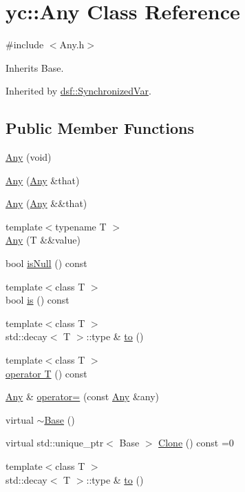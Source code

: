 \hypertarget{classyc_1_1_any}{}\section{yc\+:\+:Any Class Reference}
\label{classyc_1_1_any}


{\ttfamily \#include $<$Any.\+h$>$}



Inherits Base.



Inherited by \hyperlink{classdsf_1_1_synchronized_var}{dsf\+::\+Synchronized\+Var}.

\subsection*{Public Member Functions}
\begin{DoxyCompactItemize}
\item 
\hyperlink{classyc_1_1_any_ad8fcf7b262813c063a49dfc91a88e771}{Any} (void)
\item 
\hyperlink{classyc_1_1_any_a30faf7a0b6018dc259853ee153112003}{Any} (\hyperlink{classyc_1_1_any}{Any} \&that)
\item 
\hyperlink{classyc_1_1_any_a42a1478072e69e4bcdb1e3b46cb0a270}{Any} (\hyperlink{classyc_1_1_any}{Any} \&\&that)
\item 
{\footnotesize template$<$typename T $>$ }\\\hyperlink{classyc_1_1_any_a55eb7a9883b93f61c051bdc0f67ab667}{Any} (T \&\&value)
\item 
bool \hyperlink{classyc_1_1_any_aceb067996f86a6a6b3a15f5c7f4bf3c8}{is\+Null} () const 
\item 
{\footnotesize template$<$class T $>$ }\\bool \hyperlink{classyc_1_1_any_aa70f1a046474d7b621331e44fdb6c20a}{is} () const 
\item 
{\footnotesize template$<$class T $>$ }\\std\+::decay$<$ T $>$\+::type \& \hyperlink{classyc_1_1_any_a3db663604505ef8d7e84dd41d5bfcc75}{to} ()
\item 
{\footnotesize template$<$class T $>$ }\\\hyperlink{classyc_1_1_any_a93c8a2b87ab82f62c3757af23981002e}{operator T} () const 
\item 
\hyperlink{classyc_1_1_any}{Any} \& \hyperlink{classyc_1_1_any_a52a7e3379867190ca9da0554d9323853}{operator=} (const \hyperlink{classyc_1_1_any}{Any} \&any)
\item 
virtual \hyperlink{classyc_1_1_any_a6b4586022a065098835382038e61e047}{$\sim$\+Base} ()
\item 
virtual std\+::unique\+\_\+ptr$<$ Base $>$ \hyperlink{classyc_1_1_any_af0f21086581a5ac8edcb01cd6204678c}{Clone} () const =0
\item 
{\footnotesize template$<$class T $>$ }\\std\+::decay$<$ T $>$\+::type \& \hyperlink{classyc_1_1_any_a3db663604505ef8d7e84dd41d5bfcc75}{to} ()
\end{DoxyCompactItemize}


